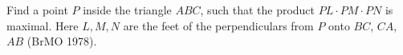 Find a point $P$ inside the triangle $ABC$, such that the product $PL \cdot PM \cdot PN$ is maximal. Here $L, M, N$ are the feet of the perpendiculars from $P$ onto $BC$, $CA$, $AB$ (BrMO 1978).
